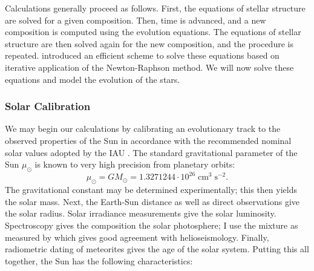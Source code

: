 \noindent Calculations generally proceed as follows. 
First, the equations of stellar structure are solved for a given composition. 
Then, time is advanced, and a new composition is computed using the evolution equations. 
The equations of stellar structure are then solved again for the new composition, and the procedure is repeated. 
\citet{1959ApJ...129..628H} introduced an efficient scheme to solve these equations based on iterative application of the Newton-Raphson method. 
We will now solve these equations and model the evolution of the stars. %


\subsubsection*{Solar Calibration}
\label{sec:calibration}

We may begin our calculations by calibrating an evolutionary track to the observed properties of the Sun \citep[e.g.][]{1982MNRAS.199..735C} in accordance with the recommended nominal solar values adopted by the IAU \citep{2015arXiv151007674M}. 
The standard gravitational parameter of the Sun $\mu_\odot$ is known to very high precision from planetary orbits: 
\begin{equation*}
    \mu_\odot = GM_\odot = 1.3271244 \cdot 10^{26} \; \text{cm}^3 \; \text{s}^{-2}.
\end{equation*}
The gravitational constant may be determined experimentally; this then yields the solar mass. 
Next, the Earth-Sun distance as well as direct observations give the solar radius. 
Solar irradiance measurements give the solar luminosity. 
Spectroscopy gives the composition the solar photosphere; I use the mixture as measured by \citet[][hereinafter \textsc{GS98}]{1998SSRv...85..161G} which gives good agreement with helioseismology. 
Finally, radiometric dating of meteorites gives the age of the solar system. 
Putting this all together, the Sun has the following characteristics: 
